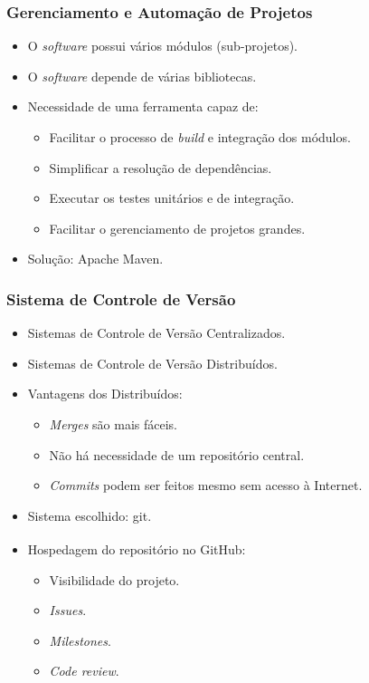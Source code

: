 \frame
{
\frametitle{Gerenciamento e Automação de Projetos}
	\begin{itemize}
		\item O \emph{software} possui vários módulos (sub-projetos).
		\item O \emph{software} depende de várias bibliotecas.
		\item Necessidade de uma ferramenta capaz de:
		\begin{itemize}
			\item Facilitar o processo de \emph{build} e integração dos módulos.
			\item Simplificar a resolução de dependências.
			\item Executar os testes unitários e de integração.
			\item Facilitar o gerenciamento de projetos grandes.
		\end{itemize}
		\item Solução: Apache Maven.
	\end{itemize}
}

\frame
{
\frametitle{Sistema de Controle de Versão}
	\begin{itemize}
		\item Sistemas de Controle de Versão Centralizados.
		\item Sistemas de Controle de Versão Distribuídos.
		\item Vantagens dos Distribuídos:
		\begin{itemize}
			\item \emph{Merges} são mais fáceis.
			\item Não há necessidade de um repositório central.
			\item \emph{Commits} podem ser feitos mesmo sem acesso à Internet.
		\end{itemize}
		\item Sistema escolhido: git.
		\item Hospedagem do repositório no GitHub{\textsuperscript\textregistered}:
		\begin{itemize}
			\item Visibilidade do projeto.
			\item \emph{Issues}.
			\item \emph{Milestones}.
			\item \emph{Code review}.
		\end{itemize}
	\end{itemize}
}

